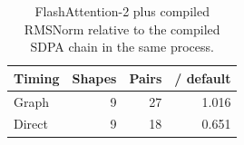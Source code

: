 \begin{table}[t]

\centering\small

\caption{FlashAttention-2 plus compiled RMSNorm relative to the compiled SDPA chain in the same process.}

\label{tab:fa2-supplement}

\begin{tabular}{@{}lrrr@{}}

\toprule

Timing & Shapes & Pairs & / default \\

\midrule

Graph & 9 & 27 & 1.016 \\

Direct & 9 & 18 & 0.651 \\

\bottomrule

\end{tabular}

\end{table}
